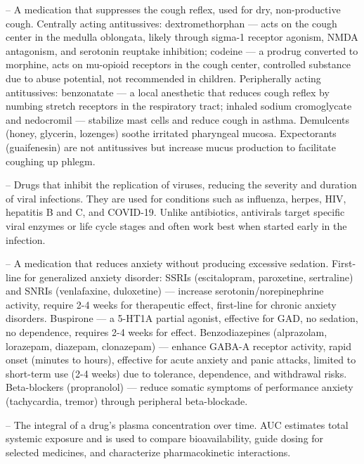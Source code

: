 -- A medication that suppresses the cough reflex, used for dry, non-productive cough. Centrally acting antitussives: dextromethorphan — acts on the cough center in the medulla oblongata, likely through sigma-1 receptor agonism, NMDA antagonism, and serotonin reuptake inhibition; codeine — a prodrug converted to morphine, acts on mu-opioid receptors in the cough center, controlled substance due to abuse potential, not recommended in children. Peripherally acting antitussives: benzonatate — a local anesthetic that reduces cough reflex by numbing stretch receptors in the respiratory tract; inhaled sodium cromoglycate and nedocromil — stabilize mast cells and reduce cough in asthma. Demulcents (honey, glycerin, lozenges) soothe irritated pharyngeal mucosa. Expectorants (guaifenesin) are not antitussives but increase mucus production to facilitate coughing up phlegm.

-- Drugs that inhibit the replication of viruses, reducing the severity and duration of viral infections. They are used for conditions such as influenza, herpes, HIV, hepatitis B and C, and COVID-19. Unlike antibiotics, antivirals target specific viral enzymes or life cycle stages and often work best when started early in the infection.

-- A medication that reduces anxiety without producing excessive sedation. First-line for generalized anxiety disorder: SSRIs (escitalopram, paroxetine, sertraline) and SNRIs (venlafaxine, duloxetine) — increase serotonin/norepinephrine activity, require 2-4 weeks for therapeutic effect, first-line for chronic anxiety disorders. Buspirone — a 5-HT1A partial agonist, effective for GAD, no sedation, no dependence, requires 2-4 weeks for effect. Benzodiazepines (alprazolam, lorazepam, diazepam, clonazepam) — enhance GABA-A receptor activity, rapid onset (minutes to hours), effective for acute anxiety and panic attacks, limited to short-term use (2-4 weeks) due to tolerance, dependence, and withdrawal risks. Beta-blockers (propranolol) — reduce somatic symptoms of performance anxiety (tachycardia, tremor) through peripheral beta-blockade.

-- The integral of a drug’s plasma concentration over time. AUC estimates total systemic exposure and is used to compare bioavailability, guide dosing for selected medicines, and characterize pharmacokinetic interactions.

